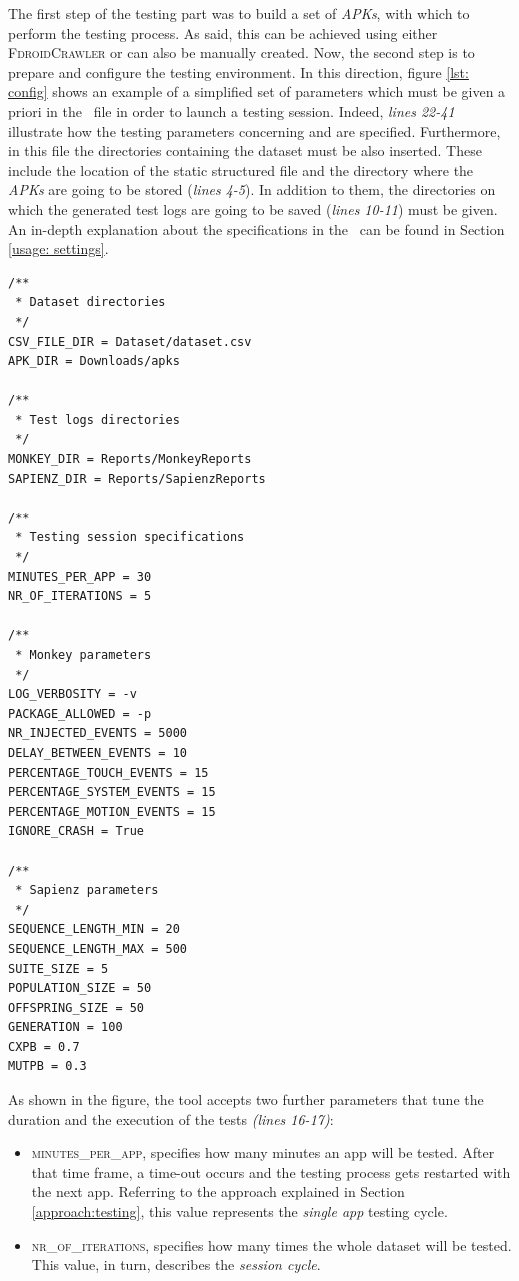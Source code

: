 The first step of the testing part was to build a set of \textit{APKs}, with which to perform the testing process. As said, this can be achieved using either \textsc{FdroidCrawler} or can also be manually created. Now, the second step is to prepare and configure the testing environment. 
In this direction, figure \ref{lst: config} shows an example of a simplified set of parameters which must be given a priori in the \Config\ file in order to launch a testing session. 
Indeed, \textit{lines 22-41} illustrate how the testing parameters concerning \monkey and \sapienz are specified.
Furthermore, in this file the directories containing the dataset must be also inserted. 
These include the location of the static structured file and the directory where the \textit{APKs} are going to be stored (\textit{lines 4-5}).
In addition to them, the directories on which the generated test logs are going to be saved (\textit{lines 10-11}) must be given. \\
An in-depth explanation about the specifications in the \Config\ can be found in Section \ref{usage: settings}.
\newpage
\begin{lstlisting}[caption=Properties which get elaborated during the testing sessions,label={lst: config}]
/**
 * Dataset directories
 */
CSV_FILE_DIR = Dataset/dataset.csv
APK_DIR = Downloads/apks 

/**
 * Test logs directories
 */
MONKEY_DIR = Reports/MonkeyReports
SAPIENZ_DIR = Reports/SapienzReports

/**
 * Testing session specifications
 */
MINUTES_PER_APP = 30
NR_OF_ITERATIONS = 5

/**
 * Monkey parameters
 */
LOG_VERBOSITY = -v 
PACKAGE_ALLOWED = -p
NR_INJECTED_EVENTS = 5000
DELAY_BETWEEN_EVENTS = 10
PERCENTAGE_TOUCH_EVENTS = 15
PERCENTAGE_SYSTEM_EVENTS = 15
PERCENTAGE_MOTION_EVENTS = 15
IGNORE_CRASH = True

/**
 * Sapienz parameters
 */
SEQUENCE_LENGTH_MIN = 20
SEQUENCE_LENGTH_MAX = 500
SUITE_SIZE = 5
POPULATION_SIZE = 50
OFFSPRING_SIZE = 50
GENERATION = 100
CXPB = 0.7
MUTPB = 0.3
\end{lstlisting}
As shown in the figure, the tool accepts two further parameters that tune the duration and the execution of the tests \textit{(lines 16-17)}:
\begin{itemize}
\item \textsc{minutes\_per\_app}, specifies how many minutes an app will be tested. After that time frame, a time-out occurs and the testing process gets restarted with the next app. 
Referring to the approach explained in Section \ref{approach:testing}, this value represents the  \textit{single app} testing cycle.
\item \textsc{nr\_of\_iterations}, specifies how many times the whole dataset will be tested.
This value, in turn, describes the \textit{session cycle}.
\end{itemize}
